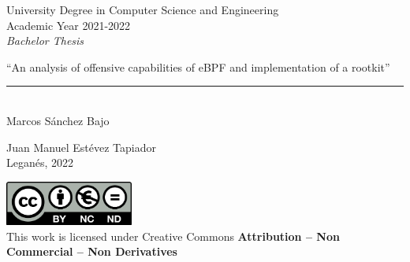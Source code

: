 \documentclass[12pt]{report} %
\begin{document}
	
\begin{titlepage}
	\begin{sffamily}
	\color{azulUC3M}
	\begin{center}
		\begin{figure}[H] %
		\end{figure}
		\vspace{2.5cm}
		\begin{Large}
			University Degree in Computer Science and Engineering\\			
			Academic Year 2021-2022\\
			\vspace{2cm}		
			\textsl{Bachelor Thesis}
			\bigskip
			
		\end{Large}
		 	{\Huge ``An analysis of offensive capabilities of eBPF and implementation of a rootkit''}\\
		 	\vspace*{0.5cm}
	 		\rule{10.5cm}{0.1mm}\\
			\vspace*{0.9cm}
			{\LARGE Marcos Sánchez Bajo}\\ 
			\vspace*{1cm}
		\begin{Large}
			Juan Manuel Estévez Tapiador\\
			Leganés, 2022\\
		\end{Large}
	\end{center}
	\vfill
	\color{black}
	\includegraphics[width=4.2cm]{images/creativecommons.png}\\  
	This work is licensed under Creative Commons \textbf{Attribution – Non Commercial – Non Derivatives}
	\end{sffamily}
\end{titlepage}

\newpage
\thispagestyle{empty}
\mbox{}
\end{document}

